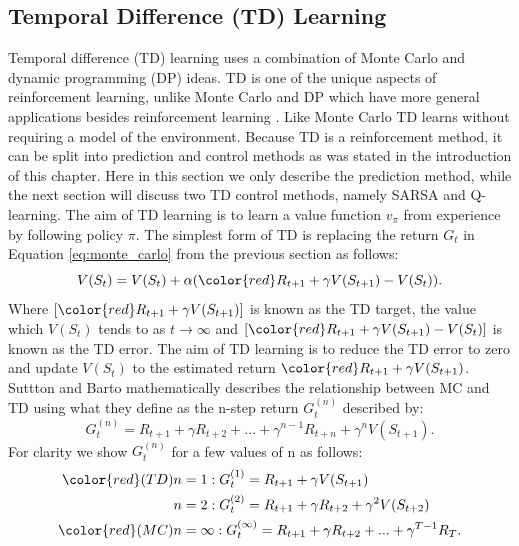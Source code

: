 \subsection{Temporal Difference (TD) Learning}
Temporal difference (TD) learning uses a combination of Monte Carlo and dynamic programming (DP) ideas. TD is one of the unique aspects of reinforcement learning, unlike Monte Carlo and DP which have more general applications besides reinforcement learning \cite{sutton_barto}. Like Monte Carlo TD learns without requiring a model of the environment. Because TD is a reinforcement method, it can be split into prediction and control methods as was stated in the introduction of this chapter. Here in this section we only describe the prediction method, while the next section will discuss two TD control methods, namely SARSA and Q-learning. The aim of TD learning is to learn a value function $v_\pi$ from experience by following policy $\pi$. 
The simplest form of TD is replacing the return $G_t$ in Equation \ref{eq:monte_carlo} from the previous section as follows:
\begin{equation}
	V(S_t) = V(S_t) + \alpha({\color{red}R_{t+1} +  \gamma V(S_{t+1})} - V(S_t)).
	\label{eq:monte_carlo_TD}
\end{equation}
Where $[{\color{red}R_{t+1} +  \gamma V(S_{t+1})}]$ is known as the TD target, the value which $V(S_t)$ tends to as $t \to \infty$ and
$[{\color{red}R_{t+1} +  \gamma V(S_{t+1})} - V(S_t)]$ is known as the TD error. The aim of TD learning is to reduce the TD error to zero and update $V(S_t)$ to the estimated return ${\color{red}R_{t+1} +  \gamma V(S_{t+1})}$.
Suttton and Barto mathematically describes the relationship between MC and TD using what they define as the n-step return $G_{t}^{(n)}$ described by:
\begin{equation}
	G_{t}^{(n)} = R_{t+1} + \gamma R_{t+2} + ... + \gamma^{n-1}R_{t+n} + \gamma^{n}V(S_{t+1}).
	\label{eq:n_step_gt}
\end{equation}
For clarity we show 
$G_{t}^{(n)}$ for a few values of n as follows:\\
\begin{align}
	 {\color{red}(TD)} n &= 1: G_{t}^{(1)} = R_{t+1}+\gamma V(S_{t+1}) \label{eq:td} \\
	n &= 2 : G_{t}^{(2)} = R_{t+1}+ \gamma R_{t+2}+\gamma^2 V(S_{t+2}) \\
	{\color{red}(MC)} n &= \infty : G_{t}^{(\infty)} = R_{t+1}+ \gamma R_{t+2}+...+\gamma^{T-1} R_T. \label{eq:mc_td}
\end{align}
